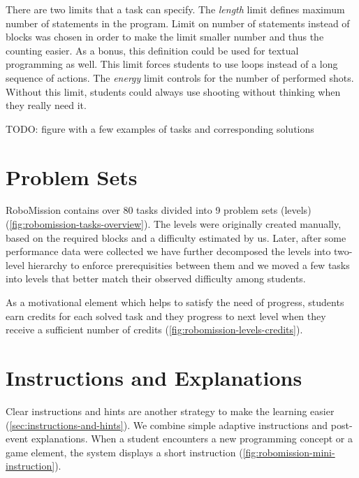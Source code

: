 There are two limits that a task can specify.
The \emph{length} limit defines maximum number of statements
in the program. Limit on number of statements instead of blocks was chosen in
order to make the limit smaller number and thus the counting easier.
As a bonus, this definition could be used for textual programming as well.
This limit forces students to use loops instead of a long sequence of
actions.
The \emph{energy} limit controls for the number
of performed shots. Without this limit, students could always use
shooting without thinking when they really need it.


TODO: figure with a few examples of tasks and corresponding solutions
\clearpage  %


\section{Problem Sets}



RoboMission contains over 80 tasks divided into 9 problem sets (levels)
(\cref{fig:robomission-tasks-overview}).
The levels were originally created manually, based on the required blocks
and a difficulty estimated by us. Later, after some performance data
were collected we have further decomposed the levels into two-level
hierarchy to enforce prerequisities between them and we moved
a few tasks into levels that better match their observed
difficulty among students.


As a motivational element which helps to satisfy the need of progress,
students earn credits for each solved task and they progress to
next level when they receive a sufficient number of credits
(\cref{fig:robomission-levels-credits}).



\section{Instructions and Explanations}
\label{sec:game.explanations}

Clear instructions and hints are another strategy to make the learning easier
(\cref{sec:instructions-and-hints}).
We combine simple adaptive instructions and post-event explanations.
When a student encounters a new programming concept or a game element,
the system displays a short instruction (\cref{fig:robomission-mini-instruction}).

